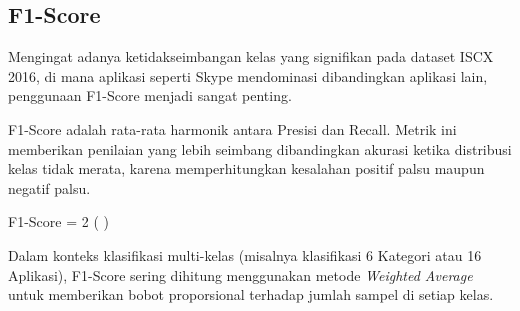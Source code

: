 \subsection{F1-Score}
Mengingat adanya ketidakseimbangan kelas yang signifikan pada dataset ISCX 2016, di mana aplikasi seperti Skype mendominasi dibandingkan aplikasi lain, penggunaan F1-Score menjadi sangat penting.

F1-Score adalah rata-rata harmonik antara Presisi dan Recall. Metrik ini memberikan penilaian yang lebih seimbang dibandingkan akurasi ketika distribusi kelas tidak merata, karena memperhitungkan kesalahan positif palsu maupun negatif palsu.

\begin{myequation}{F1-Score}
    \label{eq:f1_score}
     = 2 \cdot \left(  \right)
\end{myequation}

Dalam konteks klasifikasi multi-kelas (misalnya klasifikasi 6 Kategori atau 16 Aplikasi), F1-Score sering dihitung menggunakan metode \textit{Weighted Average} untuk memberikan bobot proporsional terhadap jumlah sampel di setiap kelas.